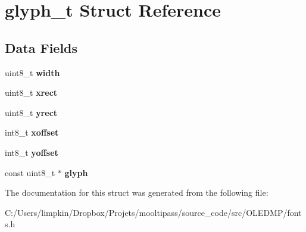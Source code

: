 \hypertarget{structglyph__t}{\section{glyph\-\_\-t Struct Reference}
\label{structglyph__t}
}
\subsection*{Data Fields}
\begin{DoxyCompactItemize}
\item 
\hypertarget{structglyph__t_a09a2a45f731b02946ff6d3cd15c1a476}{uint8\-\_\-t {\bfseries width}}\label{structglyph__t_a09a2a45f731b02946ff6d3cd15c1a476}

\item 
\hypertarget{structglyph__t_a46d1f5dd7c1a75b29bd8ff4572263129}{uint8\-\_\-t {\bfseries xrect}}\label{structglyph__t_a46d1f5dd7c1a75b29bd8ff4572263129}

\item 
\hypertarget{structglyph__t_a59c390ac18717a7ff28f85cc8a829a8e}{uint8\-\_\-t {\bfseries yrect}}\label{structglyph__t_a59c390ac18717a7ff28f85cc8a829a8e}

\item 
\hypertarget{structglyph__t_a248c78bc36899ea7581e379d926f480a}{int8\-\_\-t {\bfseries xoffset}}\label{structglyph__t_a248c78bc36899ea7581e379d926f480a}

\item 
\hypertarget{structglyph__t_a1f3726a53d108483e5f64b4cf1edda88}{int8\-\_\-t {\bfseries yoffset}}\label{structglyph__t_a1f3726a53d108483e5f64b4cf1edda88}

\item 
\hypertarget{structglyph__t_a2bad71d1abe181892d7ec3a7223b0035}{const uint8\-\_\-t $\ast$ {\bfseries glyph}}\label{structglyph__t_a2bad71d1abe181892d7ec3a7223b0035}

\end{DoxyCompactItemize}


The documentation for this struct was generated from the following file\-:\begin{DoxyCompactItemize}
\item 
C\-:/\-Users/limpkin/\-Dropbox/\-Projets/mooltipass/source\-\_\-code/src/\-O\-L\-E\-D\-M\-P/fonts.\-h\end{DoxyCompactItemize}
